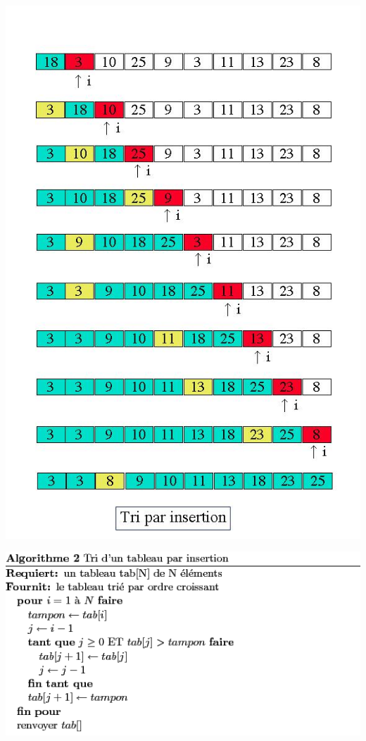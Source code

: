 \documentclass[french]{beamer}%
\begin{document}
			\begin{frame}
				\begin{center}
					\includegraphics[scale=0.22]{TIS}
				\end{center}
			\end{frame}
		
			\begin{frame}
				\begin{center}
					\includegraphics[scale=0.5]{TIC}
				\end{center}
			\end{frame}
		
\end{document}
